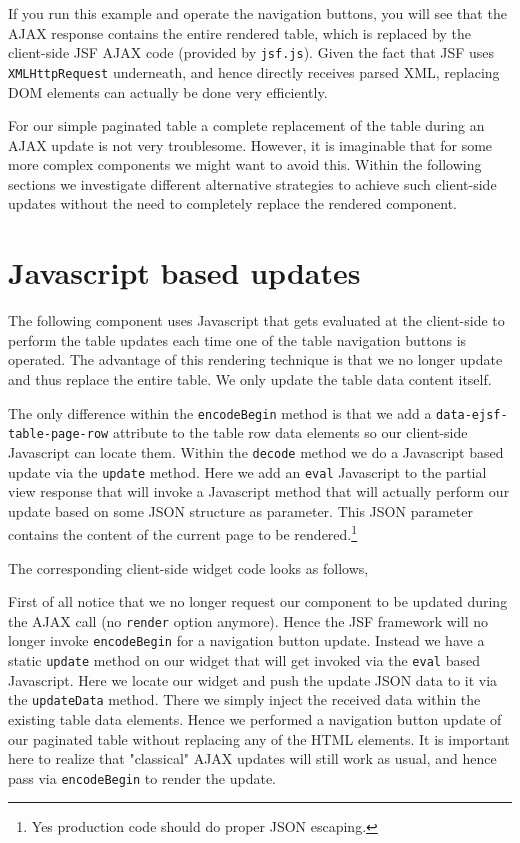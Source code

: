 If you run this example and operate the navigation buttons, you will see that the AJAX response contains the entire rendered table, which is replaced by the client-side JSF AJAX code (provided by \texttt{jsf.js}).
Given the fact that JSF uses \texttt{XMLHttpRequest} underneath, and hence directly receives parsed XML, replacing DOM elements can actually be done very efficiently.

For our simple paginated table a complete replacement of the table during an AJAX update is not very troublesome.
However, it is imaginable that for some more complex components we might want to avoid this.
Within the following sections we investigate different alternative strategies to achieve such client-side updates without the need to completely replace the rendered component.


\section{Javascript based updates}
The following component uses Javascript that gets evaluated at the client-side to perform the table updates each time one of the table navigation buttons is operated.
The advantage of this rendering technique is that we no longer update and thus replace the entire table. We only update the table data content itself.

The only difference within the \texttt{encodeBegin} method is that we add a \texttt{data-ejsf-table-\allowbreak page-row} attribute to the table row data elements so our client-side Javascript can locate them.
Within the \texttt{decode} method we do a Javascript based update via the \texttt{update} method.
Here we add an \texttt{eval} Javascript to the partial view response that will invoke a Javascript method that will actually perform our update based on some JSON structure as parameter.
This JSON parameter contains the content of the current page to be rendered.\footnote{Yes production code should do proper JSON escaping.}

The corresponding client-side widget code looks as follows,

First of all notice that we no longer request our component to be updated during the AJAX call (no \texttt{render} option anymore).
Hence the JSF framework will no longer invoke \texttt{encodeBegin} for a navigation button update.
Instead we have a static \texttt{update} method on our widget that will get invoked via the \texttt{eval} based Javascript.
Here we locate our widget and push the update JSON data to it via the \texttt{updateData} method.
There we simply inject the received data within the existing table data elements.
Hence we performed a navigation button update of our paginated table without replacing any of the HTML elements.
It is important here to realize that "classical" AJAX updates will still work as usual, and hence pass via \texttt{encodeBegin} to render the update.


